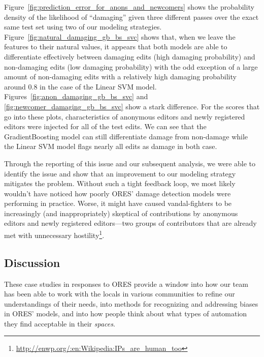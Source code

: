 

Figure~\ref{fig:prediction_error_for_anons_and_newcomers} shows the probability density of the likelihood of ``damaging'' given three different passes over the exact same test set using two of our modeling strategies.  Figure~\ref{fig:natural_damaging_gb_bs_svc} shows that, when we leave the features to their natural values, it appears that both models are able to differentiate effectively between damaging edits (high damaging probability) and non-damaging edits (low damaging probability) with the odd exception of a large amount of non-damaging edits with a relatively high damaging probability around 0.8 in the case of the Linear SVM model.  Figures~\ref{fig:anon_damaging_gb_bs_svc} and \ref{fig:newcomer_damaging_gb_bs_svc} show a stark difference.  For the scores that go into these plots, characteristics of anonymous editors and newly registered editors were injected for all of the test edits.  We can see that the GradientBoosting model can still differentiate damage from non-damage while the Linear SVM model flags nearly all edits as damage in both case.

Through the reporting of this issue and our subsequent analysis, we were able to identify the issue and show that an improvement to our modeling strategy mitigates the problem.  Without such a tight feedback loop, we most likely wouldn't have noticed how poorly ORES' damage detection models were performing in practice.  Worse, it might have caused vandal-fighters to be increasingly (and inappropriately) skeptical of contributions by anonymous editors and newly registered editors---two groups of contributors that are already met with unnecessary hostility\footnote{\url{http://enwp.org/:en:Wikipedia:IPs_are_human_too}}\cite{halfaker2013rise}.

\subsection{Discussion}
These case studies in responses to ORES provide a window into how our team has been able to work with the locals in various communities to refine our understandings of their needs, into methods for recognizing and addressing biases in ORES' models, and into how people think about what types of automation they find acceptable in their \emph{spaces}.

